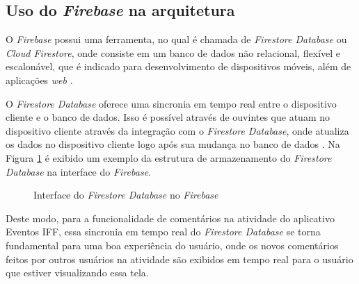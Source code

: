\subsection{Uso do \textit{Firebase} na arquitetura}

O \textit{Firebase} possui uma ferramenta, no qual é chamada de \textit{Firestore Database} ou \textit{Cloud Firestore}, onde consiste em um banco de dados não relacional, flexível e escalonável, que é indicado para desenvolvimento de dispositivos móveis, além de aplicações \textit{web} \cite{google_firebase}.

O \textit{Firestore Database} oferece uma sincronia em tempo real entre o dispositivo cliente e o banco de dados. Isso é possível através de ouvintes que atuam no dispositivo cliente através da integração com o \textit{Firestore Database}, onde atualiza os dados no dispositivo cliente logo após sua mudança no banco de dados \cite{google_firebase}. Na Figura \ref{fig:firebase} é exibido um exemplo da estrutura de armazenamento do \textit{Firestore Database} na interface do \textit{Firebase}.

\begin{figure}[H]
    \centering
    \caption{Interface do \textit{Firestore Database} no \textit{Firebase}}
    \label{fig:firebase}
\end{figure}

Deste modo, para a funcionalidade de comentários na atividade do aplicativo Eventos IFF, essa sincronia em tempo real do \textit{Firestore Database} se torna fundamental para uma boa experiência do usuário, onde os novos comentários feitos por outros usuários na atividade são exibidos em tempo real para o usuário que estiver visualizando essa tela.